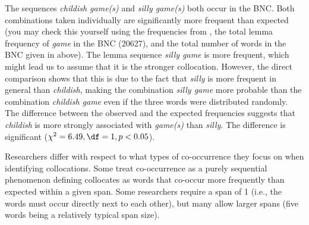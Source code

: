 The sequences \textit{childish game(s)} and \textit{silly game(s)} both occur in the BNC.  Both combinations taken individually are significantly  more frequent than expected  (you may check this yourself using the frequencies from , the total lemma  frequency of \textit{game} in the BNC (\num{20627}), and the total number of words in the BNC given in  above). The lemma sequence \textit{silly game} is more frequent, which might lead us to assume that it is the stronger collocation.  However, the direct comparison shows that this is due to the fact that \textit{silly} is more frequent in general than \textit{childish}, making the combination \textit{silly game} more probable than the combination \textit{childish game} even if the three words were distributed  randomly.  The difference between the observed and the expected  frequencies suggests that \textit{childish} is more strongly associated  with \textit{game(s)} than \textit{silly}. The difference is significant  ($\chi^2 = 6.49, \df = 1, p < 0.05$).

Researchers differ with respect to what types of co\hyp{}occurrence they focus on when identifying collocations.  Some treat co\hyp{}occurrence as a purely sequential phenomenon defining collocates as words that co\hyp{}occur more frequently than expected  within a given span.  Some researchers require a span of 1 (i.e., the words must occur directly next to each other), but many allow larger spans (five words being a relatively typical span size).

